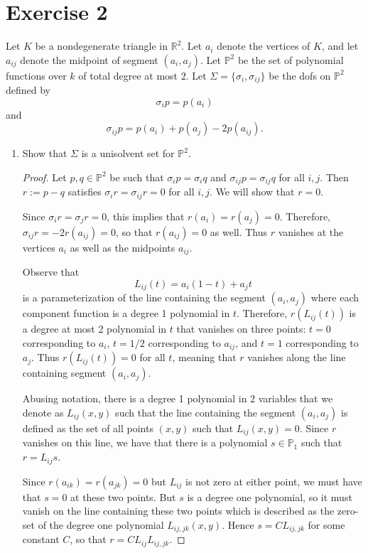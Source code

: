 \documentclass{article}
\begin{document}
\section*{Exercise 2}
Let $K$ be a nondegenerate triangle in $\mathbb R^2$.
Let $a_i$ denote the vertices of $K$, and let $a_{ij}$ denote the midpoint of segment $(a_i,a_j)$.
Let $\mathbb P^2$ be the set of polynomial functions over $k$ of total degree at most $2$.
Let $\Sigma = \{\sigma_i, \sigma_{ij}\}$ be the dofs on $\mathbb P^2$ defined by \[\sigma_i p = p(a_i)\] and \[\sigma_{ij}p = p(a_i) + p(a_j) - 2p(a_{ij}).\]
\begin{enumerate}
	\item Show that $\Sigma$ is a unisolvent set for $\mathbb P^2$.
	      \begin{proof}
		      Let $p,q \in \mathbb P^2$ be such that $\sigma_i p = \sigma_i q$ and $\sigma_{ij} p = \sigma_{ij} q$ for all $i, j$.
		      Then $r := p - q$ satisfies $\sigma_i r = \sigma_{ij} r = 0$ for all $i,j$.
		      We will show that $r = 0$.

		      Since $\sigma_i r = \sigma_j r = 0$, this implies that $r(a_i) = r(a_j) = 0$.
		      Therefore, $\sigma_{ij}r = -2r(a_{ij}) = 0$, so that $r(a_{ij}) = 0$ as well.
		      Thus $r$ vanishes at the vertices $a_i$ as well as the midpoints $a_{ij}$.

		      Observe that \[L_{ij}(t) = a_i(1-t) + a_jt\] is a parameterization of the line containing the segment $(a_i,a_j)$ where each component function is a degree 1 polynomial in $t$.
		      Therefore, $r(L_{ij}(t))$ is a degree at most 2 polynomial in $t$ that vanishes on three points: $t = 0$ corresponding to $a_i$, $t = 1/2$ corresponding to $a_{ij}$, and $t = 1$ corresponding to $a_j$.
		      Thus $r(L_{ij}(t)) = 0$ for all $t$, meaning that $r$ vanishes along the line containing segment $(a_i,a_j)$.

		      Abusing notation, there is a degree 1 polynomial in 2 variables that we denote as $L_{ij}(x,y)$ such that the line containing the segment $(a_i,a_j)$ is defined as the set of all points $(x,y)$ such that $L_{ij}(x,y) = 0$.
		      Since $r$ vanishes on this line, we have that there is a polynomial $s \in \mathbb P_1$ such that $r = L_{ij}s$.

		      Since $r(a_{ik}) = r(a_{jk}) = 0$ but $L_{ij}$ is not zero at either point, we must have that $s = 0$ at these two points.
		      But $s$ is a degree one polynomial, so it must vanish on the line containing these two points which is described as the zero-set of the degree one polynomial $L_{ij,jk}(x,y)$.
		      Hence $s = CL_{ij,jk}$ for some constant $C$, so that $r = CL_{ij}L_{ij,jk}$.


\end{proof}
\end{enumerate}
\end{document}
